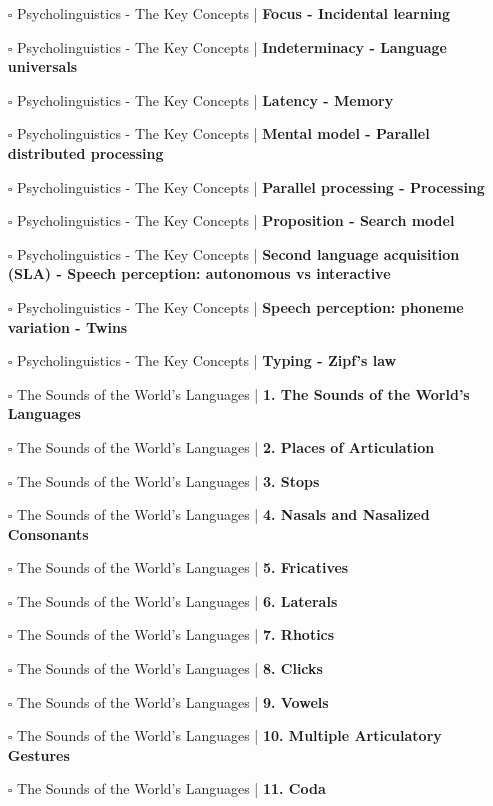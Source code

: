 \documentclass[a4, landscape, 12pt]{article}
\newcommand{\checkbox}{$\square$}%
\begin{document}
\begin{itemize}
{}
\item [\checkbox]  Psycholinguistics - The Key Concepts | \textbf{ Focus - Incidental learning
}
\item [\checkbox]  Psycholinguistics - The Key Concepts | \textbf{ Indeterminacy - Language universals
}
\item [\checkbox]  Psycholinguistics - The Key Concepts | \textbf{ Latency - Memory
}
\item [\checkbox]  Psycholinguistics - The Key Concepts | \textbf{ Mental model - Parallel distributed processing
}
\item [\checkbox]  Psycholinguistics - The Key Concepts | \textbf{ Parallel processing - Processing
}
\item [\checkbox]  Psycholinguistics - The Key Concepts | \textbf{ Proposition - Search model
}
\item [\checkbox]  Psycholinguistics - The Key Concepts | \textbf{ Second language acquisition (SLA) - Speech perception: autonomous vs interactive
}
\item [\checkbox]  Psycholinguistics - The Key Concepts | \textbf{ Speech perception: phoneme variation - Twins
}
\item [\checkbox]  Psycholinguistics - The Key Concepts | \textbf{ Typing - Zipf’s law
}
\item [\checkbox]  The Sounds of the World's Languages | \textbf{ 1. The Sounds of the World's Languages
}
\item [\checkbox]  The Sounds of the World's Languages | \textbf{ 2. Places of Articulation
}
\item [\checkbox]  The Sounds of the World's Languages | \textbf{ 3. Stops
}
\item [\checkbox]  The Sounds of the World's Languages | \textbf{ 4. Nasals and Nasalized Consonants
}
\item [\checkbox]  The Sounds of the World's Languages | \textbf{ 5. Fricatives
}
\item [\checkbox]  The Sounds of the World's Languages | \textbf{ 6. Laterals
}
\item [\checkbox]  The Sounds of the World's Languages | \textbf{ 7. Rhotics
}
\item [\checkbox]  The Sounds of the World's Languages | \textbf{ 8. Clicks
}
\item [\checkbox]  The Sounds of the World's Languages | \textbf{ 9. Vowels
}
\item [\checkbox]  The Sounds of the World's Languages | \textbf{ 10. Multiple Articulatory Gestures
}
\item [\checkbox]  The Sounds of the World's Languages | \textbf{ 11. Coda
}
\end{itemize}
\end{document}
